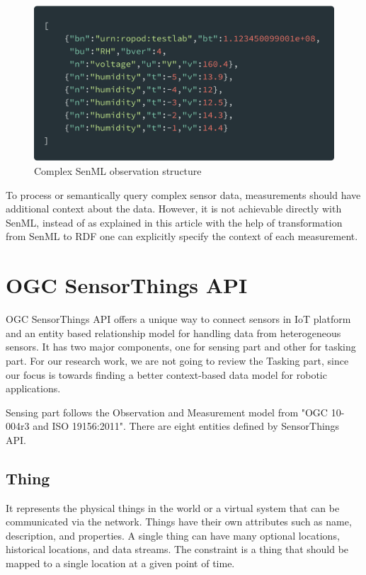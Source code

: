     \begin{figure}[!htbp] 
    	\begin{center}
    		\includegraphics[clip,scale=0.14]{./images/png/senml/complex}	
    		\caption{Complex SenML observation structure}	
    		\label{fig:senml_complex}	
    	\end{center}
    \end{figure}

	To process or semantically query complex sensor data, measurements should have additional context about the data. However, it is not achievable directly with SenML, instead of as explained in this article \cite{su2014connecting} with the help of transformation from SenML to RDF one can explicitly specify the context of each measurement.
	
	\section{OGC SensorThings API}
	OGC SensorThings API offers a unique way to connect sensors in IoT platform and an entity based relationship model for handling data from heterogeneous sensors. It has two major components, one for sensing part and other for tasking part. For our research work, we are not going to review the Tasking part, since our focus is towards finding a better context-based data model for robotic applications.
	
	Sensing part follows the Observation and Measurement model from "OGC 10-004r3 and ISO 19156:2011". There are eight entities defined by SensorThings API.
	
	\subsection{Thing}
	It represents the physical things in the world or a virtual system that can be communicated via the network. Things have their own attributes such as name, description, and properties. A single thing can have many optional locations, historical locations, and data streams. The constraint is a thing that should be mapped to a single location at a given point of time.
	
